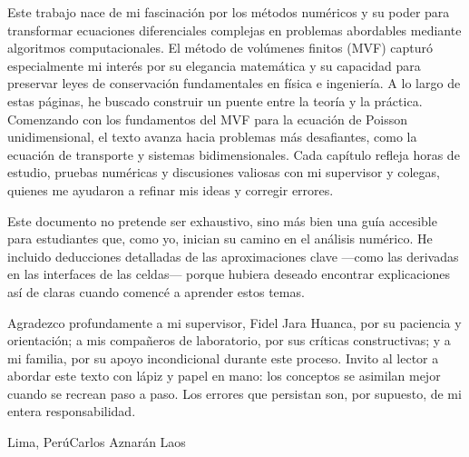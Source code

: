 \preface

Este trabajo nace de mi fascinación por los métodos numéricos y su
poder para transformar ecuaciones diferenciales complejas en problemas
abordables mediante algoritmos computacionales.
El método de volúmenes finitos (MVF) capturó especialmente mi interés
por su elegancia matemática y su capacidad para preservar leyes de
conservación fundamentales en física e ingeniería.
A lo largo de estas páginas, he buscado construir un puente entre la
teoría y la práctica.
Comenzando con los fundamentos del MVF para la ecuación de Poisson
unidimensional, el texto avanza hacia problemas más desafiantes, como
la ecuación de transporte y sistemas bidimensionales.
Cada capítulo refleja horas de estudio, pruebas numéricas y
discusiones valiosas con mi supervisor y colegas, quienes me ayudaron
a refinar mis ideas y corregir errores.

Este documento no pretende ser exhaustivo, sino más bien una guía
accesible para estudiantes que, como yo, inician su camino en el
análisis numérico.
He incluido deducciones detalladas de las aproximaciones clave
—como las derivadas en las interfaces de las celdas— porque hubiera
deseado encontrar explicaciones así de claras cuando comencé a
aprender estos temas.

Agradezco profundamente a mi supervisor, Fidel Jara Huanca, por su
paciencia y orientación; a mis compañeros de laboratorio, por sus
críticas constructivas; y a mi familia, por su apoyo incondicional
durante este proceso.
Invito al lector a abordar este texto con lápiz y papel en mano: los
conceptos se asimilan mejor cuando se recrean paso a paso.
Los errores que persistan son, por supuesto, de mi entera
responsabilidad.

\vspace{\baselineskip}
\begin{flushright}\noindent
	Lima, Perú\hfill Carlos Aznarán Laos
\end{flushright}


